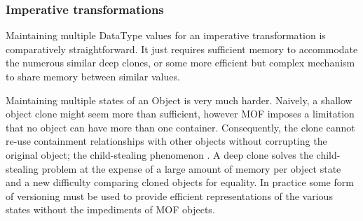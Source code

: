 \documentclass[runningheads,a4paper]{llncs}
\begin{document}
\subsubsection{Imperative transformations}

Maintaining multiple DataType values for an imperative transformation is comparatively straightforward. It just requires sufficient memory to accommodate the numerous similar deep clones, or some more efficient but complex mechanism to share memory between similar values.

Maintaining multiple states of an Object is very much harder. Naively, a shallow object clone might seem more than sufficient, however MOF imposes a limitation that no object can have more than one container. Consequently, the clone cannot re-use containment relationships with other objects without corrupting the original object; the child-stealing phenomenon \cite{ChildStealing}. A deep clone solves the child-stealing problem at the expense of a large amount of memory per object state and a new difficulty comparing cloned objects for equality. In practice some form of versioning must be used to provide efficient representations of the various states without the impediments of MOF objects. 




\end{document}
